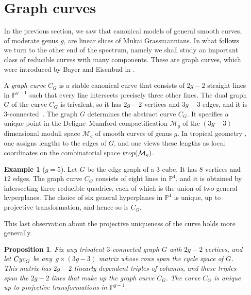 \documentclass[12pt]{extarticle}
\newtheorem{proposition}[theorem]{Proposition}
\theoremstyle{definition}
\newtheorem{example}[theorem]{Example}
\numberwithin{theorem}{section}
\theoremstyle{plain}\newtheorem{ithm}{Theorem}
\newcommand{\PP}{\mathbb{P}}
\begin{document}
\section{Graph curves}
\label{sec5}

In the previous section, we saw that canonical models of
general smooth curves, of moderate genus $g$, are
linear slices of Mukai Grassmannians. In what follows we
turn to the other end of the spectrum, namely we shall study an important
class of reducible curves with many components. These are 
graph curves, which were introduced  by Bayer and Eisenbud in \cite{BE}. 

A {\em graph curve} $C_G$ is a stable canonical curve that consists of
$2g-2$ straight lines in $\PP^{g-1}$ such that every
line intersects precisely three other lines. The dual graph $G$ of the curve
$C_G$ is trivalent, so it has $2g-2$ vertices and $3g-3$ edges, and it is 
$3$-connected~\cite[Proposition 2.5(ii)]{BE}. The graph $G$
determines the abstract curve $C_G$. It
specifies a unique point in the Deligne--Mumford
compactification $\overline{\mathcal{M}}_g$ of the 
$(3g-3)$-dimensional moduli space $\mathcal{M}_g$
of smooth curves of genus $g$. In tropical
geometry \cite{Mel}, one assigns lengths to the edges of $G$, and one views these lengths
as local coordinates on the combinatorial space 
${\rm trop}(\mathcal{M}_g)$.

\begin{example}[$g=5$] \label{eq:cubecurve} Let $G$ be the edge graph of
  a $3$-cube. It has $8$ vertices and $12$ edges.
  The graph curve $C_G$ consists of eight lines in $\PP^4$,
  and it is obtained by intersecting three reducible quadrics, each of
  which is the union of two general hyperplanes.
  The choice of six  general hyperplanes in $\PP^4$ is unique, 
  up to projective transformation, and hence so is $C_G$.
\end{example}


This last observation about the projective uniqueness
of the curve holds more generally.
 
\begin{proposition} \label{prop:graphcurveunique}
  Fix any trivalent $3$-connected graph $G$ with $2g-2$ vertices,
  and let ${\rm Cyc}_G$ be any $\,g \times (3g-3)$ matrix whose
  rows span the cycle space of $G$. This matrix has $2g-2$
  linearly dependent triples of columns, and these triples
  span the $2g-2$ lines that make up the graph curve $C_G$. The curve
  $C_G$ is unique up to projective transformations in $\PP^{g-1}$.
\end{proposition}
\end{document}

